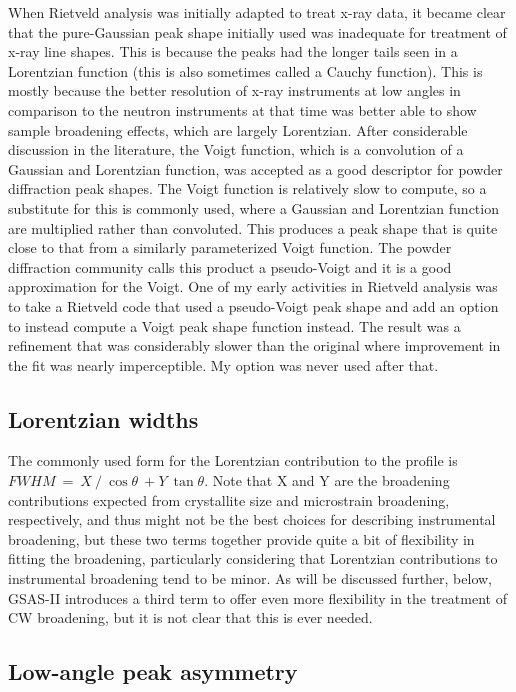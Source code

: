 When Rietveld analysis was initially adapted to treat x-ray data, it became clear that the pure-Gaussian peak shape initially used was inadequate for treatment of x-ray line shapes. This is because the peaks had the longer tails seen in a Lorentzian function (this is also sometimes called a Cauchy function). This is mostly because the better resolution of x-ray instruments at low angles in comparison to the neutron instruments at that time was better able to show sample broadening effects, which are largely Lorentzian. After considerable discussion in the literature, the Voigt function, which is a convolution of a Gaussian and Lorentzian function, was accepted as a good descriptor for powder diffraction peak shapes. The Voigt function is relatively slow to compute, so a substitute for this is commonly used, where a Gaussian and Lorentzian function are multiplied rather than convoluted. This produces a peak shape that is quite close to that from a similarly parameterized Voigt function. The powder diffraction community calls this product a pseudo-Voigt and it is a good approximation for the Voigt. One of my early activities in Rietveld analysis was to take a Rietveld code that used a pseudo-Voigt peak shape and add an option to instead compute a Voigt peak shape function instead. The result was a refinement that was considerably slower than the original where improvement in the fit was nearly imperceptible. My option was never used after that. 

\subsection{Lorentzian widths}

 The commonly used form for the Lorentzian contribution to the profile is $FWHM\ =\ X\ /\ \cos{\theta}\ +Y\ \tan{\theta}$. Note that X and Y are the broadening contributions expected from crystallite size and microstrain broadening, respectively, and thus might not be the best choices for describing instrumental broadening, but these two terms together provide quite a bit of flexibility in fitting the broadening, particularly considering that Lorentzian contributions to instrumental broadening tend to be minor. As will be discussed further, below, GSAS-II introduces a third term to offer even more flexibility in the treatment of CW broadening, but it is not clear that this is ever needed. 

\subsection{Low-angle peak asymmetry}
\label{sec:FCJ}

